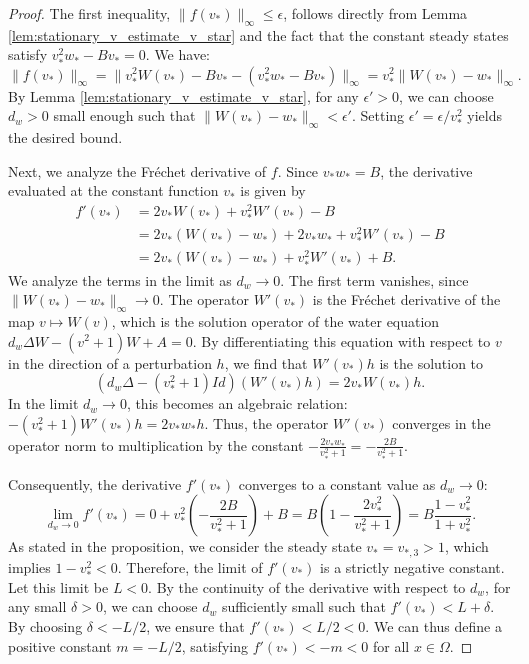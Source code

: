 \documentclass[11pt, a4paper]{article}
\theoremstyle{break}
\theoremstyle{break}
\theoremstyle{break}
\theoremstyle{break}
\theoremstyle{break}
\theoremstyle{break}
\theoremstyle{break}
\theoremstyle{break}
\theoremstyle{break}
\begin{document}
\begin{proof}
    The first inequality, $\|f(v_*)\|_\infty \leq \epsilon$, follows directly from Lemma \ref{lem:stationary_v_estimate_v_star} and the fact that the constant steady states satisfy $v_*^2w_* - Bv_* = 0$. We have:
    \begin{equation*}
        \|f(v_*)\|_\infty 
        =
        \|v_*^2W(v_*) - Bv_* - (v_*^2w_* - Bv_*)\|_\infty
        =
        v_*^2\|W(v_*) - w_*\|_\infty.
    \end{equation*}
    By Lemma \ref{lem:stationary_v_estimate_v_star}, for any $\epsilon' > 0$, we can choose $d_w > 0$ small enough such that $\|W(v_*) - w_*\|_\infty < \epsilon'$. Setting $\epsilon' = \epsilon / v_*^2$ yields the desired bound.

    Next, we analyze the Fr\'echet derivative of $f$. Since $v_*w_* = B$, the derivative evaluated at the constant function $v_*$ is given by
    \begin{align*}
        f'(v_*) 
        &=
        2v_*W(v_*) + v_*^2W'(v_*) - B \\
        &=
        2v_*(W(v_*) - w_*) + 2v_*w_* + v_*^2W'(v_*) - B \\
        &=
        2v_*(W(v_*) - w_*) + v_*^2W'(v_*) + B.
    \end{align*}
    We analyze the terms in the limit as $d_w \to 0$. The first term vanishes, since $\|W(v_*) - w_*\|_\infty \to 0$. The operator $W'(v_*)$ is the Fr\'echet derivative of the map $v \mapsto W(v)$, which is the solution operator of the water equation $d_w \Delta W - (v^2+1)W + A = 0$. By differentiating this equation with respect to $v$ in the direction of a perturbation $h$, we find that $W'(v_*)h$ is the solution to
    \begin{equation*}
        (d_w \Delta - (v_*^2+1)Id)(W'(v_*)h) = 2v_* W(v_*) h.
    \end{equation*}
    In the limit $d_w \to 0$, this becomes an algebraic relation: $-(v_*^2+1)W'(v_*)h = 2v_* w_* h$. Thus, the operator $W'(v_*)$ converges in the operator norm to multiplication by the constant $-\frac{2v_*w_*}{v_*^2+1} = -\frac{2B}{v_*^2+1}$.
    
    Consequently, the derivative $f'(v_*)$ converges to a constant value as $d_w \to 0$:
    \begin{equation*}
        \lim_{d_w \to 0} f'(v_*) = 0 + v_*^2 \left( -\frac{2B}{v_*^2+1} \right) + B = B \left( 1 - \frac{2v_*^2}{v_*^2+1} \right) = B \frac{1-v_*^2}{1+v_*^2}.
    \end{equation*}
    As stated in the proposition, we consider the steady state $v_* = v_{*,3} > 1$, which implies $1 - v_*^2 < 0$. Therefore, the limit of $f'(v_*)$ is a strictly negative constant. Let this limit be $L < 0$. By the continuity of the derivative with respect to $d_w$, for any small $\delta > 0$, we can choose $d_w$ sufficiently small such that $f'(v_*) < L + \delta$. By choosing $\delta < -L/2$, we ensure that $f'(v_*) < L/2 < 0$. We can thus define a positive constant $m = -L/2$, satisfying $f'(v_*) < -m < 0$ for all $x \in \Omega$.


\end{proof}
\end{document}
